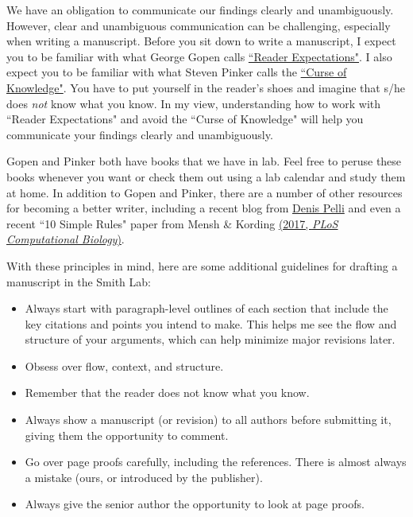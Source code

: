 \documentclass[letterpaper,12pt,oneside]{memoir}
\begin{document}
We have an obligation to communicate our findings clearly and unambiguously. However, clear and unambiguous communication can be challenging, especially when writing a manuscript. Before you sit down to write a manuscript, I expect you to be familiar with what George Gopen calls \href{https://cseweb.ucsd.edu/~swanson/papers/science-of-writing.pdf}{``Reader Expectations"}. I also expect you to be familiar with what Steven Pinker calls the \href{https://stevenpinker.com/files/pinker/files/why_academics_stink_at_writing.pdf}{``Curse of Knowledge"}. You have to put yourself in the reader's shoes and imagine that s/he does \textit{not} know what you know. In my view, understanding how to work with ``Reader Expectations" and avoid the ``Curse of Knowledge" will help you communicate your findings clearly and unambiguously.

Gopen and Pinker both have books that we have in lab. Feel free to peruse these books whenever you want or check them out using a lab calendar and study them at home. In addition to Gopen and Pinker, there are a number of other resources for becoming a better writer, including a recent blog from \href{http://psych.nyu.edu/pelli/style.html}{Denis Pelli} and even a recent ``10 Simple Rules" paper from Mensh \& Kording \href{http://journals.plos.org/ploscompbiol/article?id=10.1371/journal.pcbi.1005619}{(2017, \textit{PLoS Computational Biology})}.

With these principles in mind, here are some additional guidelines for drafting a manuscript in the Smith Lab:

\begin{itemize}
\item Always start with paragraph-level outlines of each section that include the key citations and points you intend to make. This helps me see the flow and structure of your arguments, which can help minimize major revisions later. 
\item Obsess over flow, context, and structure.
\item Remember that the reader does not know what you know.
\item Always show a manuscript (or revision) to all authors before submitting it, giving them the opportunity to comment.
\item Go over page proofs carefully, including the references. There is almost always a mistake (ours, or introduced by the publisher).
\item Always give the senior author the opportunity to look at page proofs.
\end{itemize}
\end{document}
